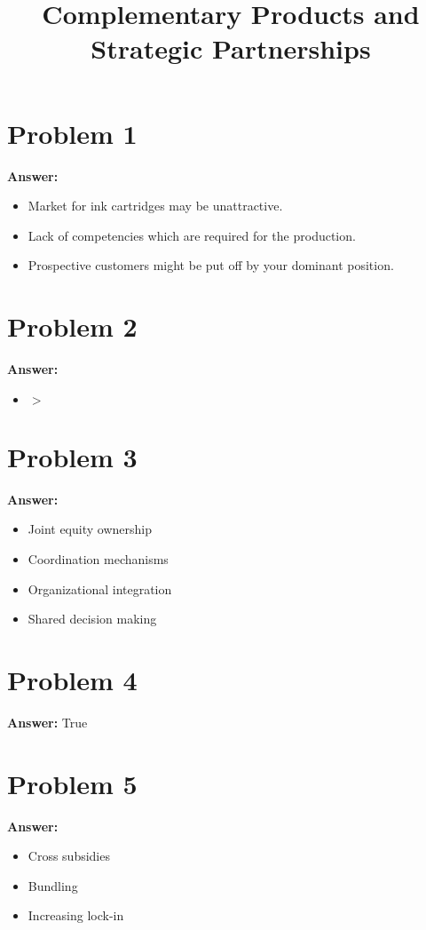 \documentclass[11pt]{article}
\date{}
\title{Complementary Products and Strategic Partnerships}
\begin{document}
\thispagestyle{empty}
\pagestyle{empty}
\section*{Problem 1}
\label{sec:org45ce7b2}

\textbf{Answer:}
\begin{itemize}
\item Market for ink cartridges may be unattractive.
\item Lack of competencies which are required for the production.
\item Prospective customers might be put off by your dominant position.
\end{itemize}
\section*{Problem 2}
\label{sec:orgb4f6163}

\textbf{Answer:}
\begin{itemize}
\item \(>\)
\end{itemize}
\section*{Problem 3}
\label{sec:orgfdb9002}

\textbf{Answer:}
\begin{itemize}
\item Joint equity ownership
\item Coordination mechanisms
\item Organizational integration
\item Shared decision making
\end{itemize}
\section*{Problem 4}
\label{sec:orgb8799c7}

\textbf{Answer:} True
\section*{Problem 5}
\label{sec:org8673338}

\textbf{Answer:}
\begin{itemize}
\item Cross subsidies
\item Bundling
\item Increasing lock-in
\end{itemize}
\end{document}

